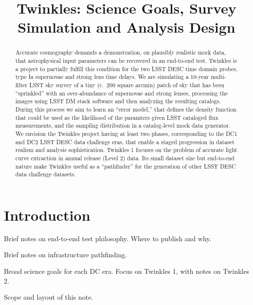 \documentclass[\docopts]{\docclass}
\begin{document}
\title{ Twinkles: Science Goals, Survey Simulation and Analysis Design }

\maketitlepre

\begin{abstract}

Accurate cosmography demands a demonstration, on plausibly realistic mock data, that astrophysical input parameters can be recovered in an end-to-end test.
Twinkles is a project to partially fulfill this condition for the two LSST DESC time domain probes, type Ia supernovae and strong lens time delays.
We are simulating a 10-year multi-filter LSST sky survey of a tiny (c.\ 200 square arcmin) patch of sky that has been ``sprinkled'' with an over-abundance of supernovae and strong lenses, processing the images using LSST DM stack software and then analyzing the resulting catalogs.
During this process we aim to learn an ``error model,'' that defines the density function that could be used as the likelihood of the paramters given LSST cataloged flux measurements, and the sampling distribution in a catalog-level mock data generator.
We envision the Twinkles project having at least two phases, corresponding to the DC1 and DC2 LSST DESC data challenge eras, that  enable a staged progression in dataset realism and analysis sophistication.
Twinkles 1 focuses on the problem of accurate light curve extraction in annual release (Level 2) data.
Its small dataset size but end-to-end nature make Twinkles useful as a ``pathfinder'' for the generation of other LSST DESC data challenge datasets.

\end{abstract}


\maketitlepost

%

\section{Introduction}
\label{sec:intro}

Brief notes on end-to-end test philosophy. Where to publish and why.

Brief notes on infrastructure pathfinding.

Broad science goals for each DC era. Focus on Twinkles 1, with notes on Twinkles 2.

Scope and layout of this note.
\end{document}
